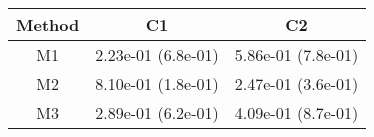\begin{tabular}{ccc}
\toprule
Method&C1&C2\tabularnewline
\midrule
M1& 2.23e-01 (6.8e-01)& 5.86e-01 (7.8e-01)\tabularnewline
M2& 8.10e-01 (1.8e-01)& 2.47e-01 (3.6e-01)\tabularnewline
M3& 2.89e-01 (6.2e-01)& 4.09e-01 (8.7e-01)\tabularnewline
\bottomrule
\end{tabular}
